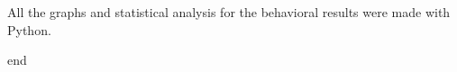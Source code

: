 All the graphs and statistical analysis for the behavioral results were made with Python.

        

        
        
        
        
end